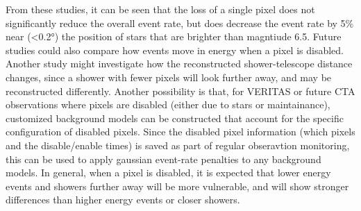    From these studies, it can be seen that the loss of a single pixel does not significantly reduce the overall event rate, but does decrease the event rate by \nicetilde{}5\% near (<\ang{0.2}) the position of stars that are brighter than magntiude 6.5.
    Future studies could also compare how events move in energy when a pixel is disabled.
    Another study might investigate how the reconstructed shower-telescope distance changes, since a shower with fewer pixels will look further away, and may be reconstructed differently.
    Another possibility is that, for VERITAS or future CTA observations where pixels are disabled (either due to stars or maintainance), customized background models can be constructed that account for the specific configuration of disabled pixels.
    Since the disabled pixel information (which pixels and the disable/enable times) is saved as part of regular obseravtion monitoring, this can be used to apply gaussian event-rate penalties to any background models.
    In general, when a pixel is disabled, it is expected that lower energy events and showers further away will be more vulnerable, and will show stronger differences than higher energy events or closer showers.


